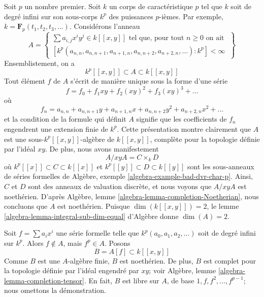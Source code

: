 \medskip\noindent
Soit $p$ un nombre premier. Soit $k$ un corps de caractéristique $p$
tel que $k$ soit de degré infini sur son sous-corps $k^p$ des puissances $p$-ièmes.
Par exemple, $k = \mathbf{F}_p(t_1, t_2, t_3, \ldots)$.
Considérons l'anneau
$$
A =
\left\{
\begin{matrix}
\sum a_{i, j} x^iy^j \in k[[x, y]] \text{ tel que, pour tout }n \geq 0
\text{ on ait } \\
[k^p(a_{n, n}, a_{n, n + 1}, a_{n + 1, n},
a_{n, n + 2}, a_{n + 2, n}, \ldots) : k^p] < \infty
\end{matrix}
\right\}
$$
Ensemblistement, on a
$$
k^p[[x, y]] \subset A  \subset k[[x, y]]
$$
Tout élément $f$ de $A$ s'écrit de manière unique sous la forme d'une série
$$
f = f_0 + f_1 xy + f_2 (xy)^2 + f_3 (xy)^3 + \ldots
$$
où
$$
f_n = a_{n, n} + a_{n, n + 1} y + a_{n + 1, n} x +
a_{n, n + 2} y^2 + a_{n + 2, n} x^2 + \ldots
$$
et la condition de la formule qui définit $A$ signifie que les
coefficients de $f_n$ engendrent une extension finie de $k^p$.
Cette présentation montre clairement que $A$ est une
sous-$k^p[[x, y]]$-algèbre de $k[[x, y]]$, complète pour la
topologie définie par l'idéal $xy$. De plus, nous avons manifestement
$$
A/xy A = C \times_k D
$$
où $k^p[[x]] \subset C \subset k[[x]]$ et
$k^p[[y]] \subset D \subset k[[y]]$ sont les sous-anneaux
de séries formelles de
Algèbre, exemple \ref{algebra-example-bad-dvr-char-p}.
Ainsi, $C$ et $D$ sont des anneaux de valuation discrète, et nous voyons que $A/ xy A$ est
noethérien. D'après Algèbre, lemme \ref{algebra-lemma-completion-Noetherian}, nous
concluons que $A$ est noethérien. Puisque $\dim(k[[x, y]]) = 2$, le
lemme \ref{algebra-lemma-integral-sub-dim-equal} d'Algèbre
donne $\dim(A) = 2$.

\medskip\noindent
Soit $f = \sum a_i x^i$ une série formelle telle que
$k^p(a_0, a_1, a_2, \ldots)$ soit de degré infini sur $k^p$.
Alors $f \not \in A$, mais $f^p \in A$. Posons
$$
B = A[f] \subset k[[x, y]]
$$
Comme $B$ est une $A$-algèbre finie, $B$ est noethérien.
De plus, $B$ est complet pour la topologie définie par l'idéal engendré par $xy$; voir
Algèbre, lemme \ref{algebra-lemma-completion-tensor}.
En fait, $B$ est libre sur $A$, de base $1, f, f^2, \ldots, f^{p - 1}$;
nous omettons la démonstration.

